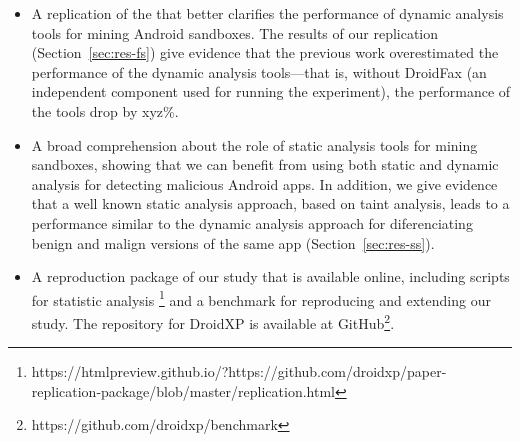 \begin{itemize}
\item A replication of the \blls that better clarifies the performance of
  dynamic analysis tools for mining Android sandboxes. The results of
  our replication (Section~\ref{sec:res-fs})
  give evidence that the previous work overestimated
  the performance of the dynamic analysis tools---that is, without
  DroidFax (an independent component used for running the
  \blls experiment), the performance of the tools drop by {\color{red}xyz\%}. 

\item A broad comprehension about the role of static analysis tools for mining
  sandboxes, showing that we can benefit from using both static and dynamic
  analysis for detecting malicious Android apps. In addition,
  we give evidence that a well known static analysis approach, based on
  taint analysis, leads to a performance similar to the dynamic analysis
  approach for diferenciating benign and malign versions of the same
  app (Section~\ref{sec:res-ss}).

\item A reproduction package of our study that is available online, including
  scripts for statistic analysis \footnote{https://htmlpreview.github.io/?https://github.com/droidxp/paper-replication-package/blob/master/replication.html}
  and a benchmark for reproducing and extending our study. The repository for DroidXP is available
at GitHub\footnote{https://github.com/droidxp/benchmark}.
 
\end{itemize}
